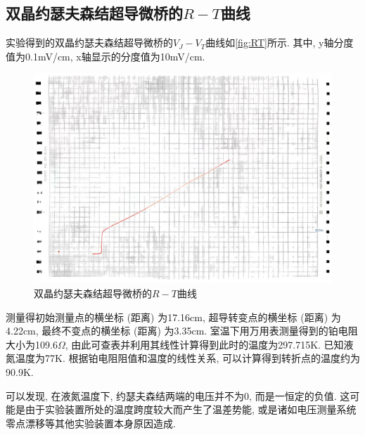 \documentclass[font=default]{mpltx}
\begin{document}
  \subsection{双晶约瑟夫森结超导微桥的$R-T$曲线}
  实验得到的双晶约瑟夫森结超导微桥的$V_J-V_T$曲线如\autoref{fig:RT}所示. 其中, y轴分度值为0.1mV/cm, x轴显示的分度值为10mV/cm.
  \begin{figure}[htbp]
    \centering
    \includegraphics[width=0.85\linewidth]{fig/3.jpg}
    \caption{双晶约瑟夫森结超导微桥的$R-T$曲线}
    \label{fig:RT}
  \end{figure}

  测量得初始测量点的横坐标 (距离) 为17.16cm, 超导转变点的横坐标 (距离) 为4.22cm, 最终不变点的横坐标 (距离) 为3.35cm.
  室温下用万用表测量得到的铂电阻大小为109.6$\Omega$, 由此可查表并利用其线性计算得到此时的温度为297.715K.
  已知液氮温度为77K. 根据铂电阻阻值和温度的线性关系, 可以计算得到转折点的温度约为90.9K. 

  \par
  可以发现, 在液氮温度下, 约瑟夫森结两端的电压并不为0, 而是一恒定的负值. 这可能是由于实验装置所处的温度跨度较大而产生了温差势能, 或是诸如电压测量系统零点漂移等其他实验装置本身原因造成.
\end{document}
